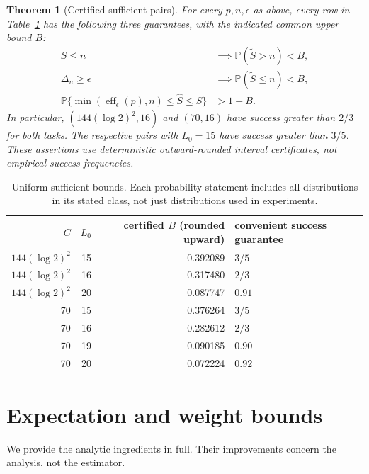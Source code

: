 \documentclass[10pt]{article}
\newtheorem{theorem}{Theorem}
\newcommand{\Prb}{\mathbb P}
\newcommand{\eff}{\operatorname{eff}}
\begin{document}
\begin{theorem}[Certified sufficient pairs]\label{thm:main}
For every $p,n,\epsilon$ as above, every row in Table~\ref{tab:constants}
has the following three guarantees, with the indicated common upper bound $B$:
\begin{align}
 S\le n&\implies\Prb(\widetilde S>n)<B,\label{eq:null}\\
 \Delta_n\ge\epsilon&\implies\Prb(\widetilde S\le n)<B,\label{eq:alternative}\\
 \Prb\{\min(\eff_\epsilon(p),n)\le\widehat S\le S\}&>1-B.
 \label{eq:joint}
\end{align}
In particular, $(144(\log2)^2,16)$ and $(70,16)$ have success greater than
$2/3$ for both tasks. The respective pairs with $L_0=15$ have success
greater than $3/5$. These assertions use deterministic outward-rounded
interval certificates, not empirical success frequencies.
\end{theorem}

\begin{table}[h]
\centering
\begin{tabular}{rrrl}
\toprule
$C$ & $L_0$ & certified $B$ (rounded upward) & convenient success guarantee\\
\midrule
$144(\log2)^2$ &15&0.392089&$3/5$\\
$144(\log2)^2$ &16&0.317480&$2/3$\\
$144(\log2)^2$ &20&0.087747&$0.91$\\
70&15&0.376264&$3/5$\\
70&16&0.282612&$2/3$\\
70&19&0.090185&$0.90$\\
70&20&0.072224&$0.92$\\
\bottomrule
\end{tabular}
\caption{Uniform sufficient bounds. Each probability statement includes all
distributions in its stated class, not just distributions used in experiments.}
\label{tab:constants}
\end{table}

\section{Expectation and weight bounds}
We provide the analytic ingredients in full. Their improvements concern
the analysis, not the estimator.
\end{document}
